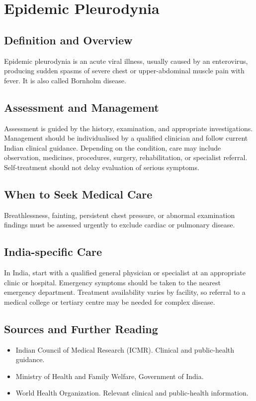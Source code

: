 \chapter{Epidemic Pleurodynia}

\section*{Definition and Overview}
Epidemic pleurodynia is an acute viral illness, usually caused by an enterovirus, producing sudden spasms of severe chest or upper-abdominal muscle pain with fever. It is also called Bornholm disease.

\section*{Assessment and Management}
Assessment is guided by the history, examination, and appropriate investigations. Management should be individualised by a qualified clinician and follow current Indian clinical guidance. Depending on the condition, care may include observation, medicines, procedures, surgery, rehabilitation, or specialist referral. Self-treatment should not delay evaluation of serious symptoms.

\section*{When to Seek Medical Care}
Breathlessness, fainting, persistent chest pressure, or abnormal examination findings must be assessed urgently to exclude cardiac or pulmonary disease.

\section*{India-specific Care}
In India, start with a qualified general physician or specialist at an appropriate clinic or hospital. Emergency symptoms should be taken to the nearest emergency department. Treatment availability varies by facility, so referral to a medical college or tertiary centre may be needed for complex disease.

\section*{Sources and Further Reading}
\begin{itemize}
    \item Indian Council of Medical Research (ICMR). Clinical and public-health guidance.
    \item Ministry of Health and Family Welfare, Government of India.
    \item World Health Organization. Relevant clinical and public-health information.
\end{itemize}

